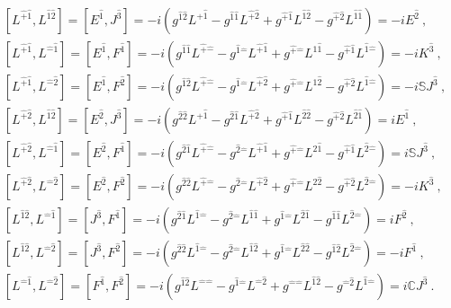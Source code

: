 \documentclass[12pt,a4paper]{report}
\begin{document}
\begin{align*}
    &\left[L^{\hat{+}\hat{1}},L^{\hat{1}\hat{2}}\right]=\left[E^{\hat{1}},J^{\hat{3}}\right]=-i\left(g^{\hat{1}\hat{2}}L^{\hat{+}\hat{1}}-g^{\hat{1}\hat{1}}L^{\hat{+}\hat{2}}+g^{\hat{+}\hat{1}}L^{\hat{1}\hat{2}}-g^{\hat{+}\hat{2}}L^{\hat{1}\hat{1}}\right)=-iE^{\hat{2}}~,\\
    &\left[L^{\hat{+}\hat{1}},L^{\hat{-}\hat{1}}\right]=\left[E^{\hat{1}},F^{\hat{1}}\right]=-i\left(g^{\hat{1}\hat{1}}L^{\hat{+}\hat{-}}-g^{\hat{1}\hat{-}}L^{\hat{+}\hat{1}}+g^{\hat{+}\hat{-}}L^{\hat{1}\hat{1}}-g^{\hat{+}\hat{1}}L^{\hat{1}\hat{-}}\right)=-iK^{\hat{3}}~,\\
    &\left[L^{\hat{+}\hat{1}},L^{\hat{-}\hat{2}}\right]=\left[E^{\hat{1}},F^{\hat{2}}\right]=-i\left(g^{\hat{1}\hat{2}}L^{\hat{+}\hat{-}}-g^{\hat{1}\hat{-}}L^{\hat{+}\hat{2}}+g^{\hat{+}\hat{-}}L^{\hat{1}\hat{2}}-g^{\hat{+}\hat{2}}L^{\hat{1}\hat{-}}\right)=-i\mathbb{S}J^{\hat{3}}~,\\
    &\left[L^{\hat{+}\hat{2}},L^{\hat{1}\hat{2}}\right]=\left[E^{\hat{2}},J^{\hat{3}}\right]=-i\left(g^{\hat{2}\hat{2}}L^{\hat{+}\hat{1}}-g^{\hat{2}\hat{1}}L^{\hat{+}\hat{2}}+g^{\hat{+}\hat{1}}L^{\hat{2}\hat{2}}-g^{\hat{+}\hat{2}}L^{\hat{2}\hat{1}}\right)=iE^{\hat{1}}~,
    \end{align*}
    \begin{align*}
    &\left[L^{\hat{+}\hat{2}},L^{\hat{-}\hat{1}}\right]=\left[E^{\hat{2}},F^{\hat{1}}\right]=-i\left(g^{\hat{2}\hat{1}}L^{\hat{+}\hat{-}}-g^{\hat{2}\hat{-}}L^{\hat{+}\hat{1}}+g^{\hat{+}\hat{-}}L^{\hat{2}\hat{1}}-g^{\hat{+}\hat{1}}L^{\hat{2}\hat{-}}\right)=i\mathbb{S}J^{\hat{3}}~,\\
    &\left[L^{\hat{+}\hat{2}},L^{\hat{-}\hat{2}}\right]=\left[E^{\hat{2}},F^{\hat{2}}\right]=-i\left(g^{\hat{2}\hat{2}}L^{\hat{+}\hat{-}}-g^{\hat{2}\hat{-}}L^{\hat{+}\hat{2}}+g^{\hat{+}\hat{-}}L^{\hat{2}\hat{2}}-g^{\hat{+}\hat{2}}L^{\hat{2}\hat{-}}\right)=-iK^{\hat{3}}~,\\
    &\left[L^{\hat{1}\hat{2}},L^{\hat{-}\hat{1}}\right]=\left[J^{\hat{3}},F^{\hat{1}}\right]=-i\left(g^{\hat{2}\hat{1}}L^{\hat{1}\hat{-}}-g^{\hat{2}\hat{-}}L^{\hat{1}\hat{1}}+g^{\hat{1}\hat{-}}L^{\hat{2}\hat{1}}-g^{\hat{1}\hat{1}}L^{\hat{2}\hat{-}}\right)=iF^{\hat{2}}~,\\
    &\left[L^{\hat{1}\hat{2}},L^{\hat{-}\hat{2}}\right]=\left[J^{\hat{3}},F^{\hat{2}}\right]=-i\left(g^{\hat{2}\hat{2}}L^{\hat{1}\hat{-}}-g^{\hat{2}\hat{-}}L^{\hat{1}\hat{2}}+g^{\hat{1}\hat{-}}L^{\hat{2}\hat{2}}-g^{\hat{1}\hat{2}}L^{\hat{2}\hat{-}}\right)=-iF^{\hat{1}}~,\\
    &\left[L^{\hat{-}\hat{1}},L^{\hat{-}\hat{2}}\right]=\left[F^{\hat{1}},F^{\hat{2}}\right]=-i\left(g^{\hat{1}\hat{2}}L^{\hat{-}\hat{-}}-g^{\hat{1}\hat{-}}L^{\hat{-}\hat{2}}+g^{\hat{-}\hat{-}}L^{\hat{1}\hat{2}}-g^{\hat{-}\hat{2}}L^{\hat{1}\hat{-}}\right)=i\mathbb{C}J^{\hat{3}}~.
\end{align*}
\end{document}
